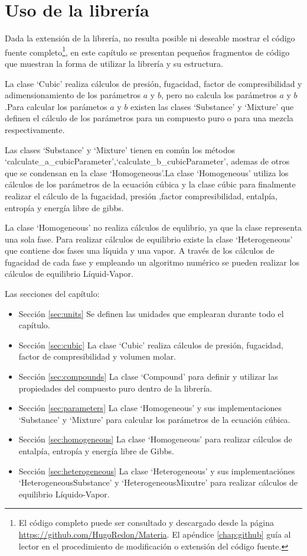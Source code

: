 \chapter{Uso de la librería}\label{chap:libraryUse}
	
	Dada la extensión de la librería, no resulta posible ni deseable mostrar el código fuente completo\footnote{El código completo puede ser consultado y descargado desde la página \url{https://github.com/HugoRedon/Materia}. El apéndice \ref{chap:github} guía al lector en el procedimiento de modificación o extensión del código fuente.}, en este capítulo se presentan pequeños fragmentos de código que muestran la forma de utilizar la librería y su estructura.
		
	La clase `Cubic' realiza cálculos de presión, fugacidad, factor de compresibilidad y adimensionamiento de los parámetros $a$ y $b$, pero no calcula los parámetros $a$ y $b$.Para calcular los parámetos $a$ y $b$ existen las clases `Substance' y `Mixture' que definen el cálculo de los parámetros para un compuesto puro o para una mezcla respectivamente. 

	Las clases `Substance' y `Mixture' tienen en común los métodos `calculate\_a\_cubicParameter',`calculate\_b\_cubicParameter', ademas de otros que se condensan en la clase `Homogeneous'.La clase `Homogeneous' utiliza los cálculos de los parámetros de la ecuación cúbica y la clase cúbic para finalmente realizar el cálculo de la fugacidad, presión ,factor compresibilidad, entalpía, entropía y energía libre de gibbs.

	La clase `Homogeneous' no realiza cálculos de equlibrio, ya que la clase representa una sola fase. Para realizar cálculos de equilibrio existe la clase `Heterogeneous' que contiene dos fases una líquida y una vapor. A través de los cálculos de fugacidad de cada fase y empleando un algoritmo numérico se pueden realizar los cálculos de equilibrio Líquid-Vapor.


	Las secciones del capítulo:
	\begin{itemize}
		\item{Sección} \ref{sec:units} Se definen las unidades que emplearan durante todo el capítulo.
		\item{Sección} \ref{sec:cubic}  La clase `Cubic' realiza cálculos de presión, fugacidad, factor de compresibilidad y volumen molar.
		\item{Sección} \ref{sec:compounds} La clase `Compound' para definir y utilizar las propiedades del compuesto puro dentro de la librería.
		\item {Sección} \ref{sec:parameters} La clase `Homogeneous' y sus implementaciones `Substance' y `Mixture' para calcular los parámetros de la ecuación cúbica.
		\item {Sección} \ref{sec:homogeneous} La clase `Homogeneous' para realizar cálculos de entalpía, entropía y energía libre de Gibbs.
		\item {Sección} \ref{sec:heterogeneous} La clase `Heterogeneous' y sus implementaciónes `HeterogeneousSubstance' y `HeterogeneousMixutre' para realizar cálculos de equilibrio Líquido-Vapor.
	\end{itemize}

